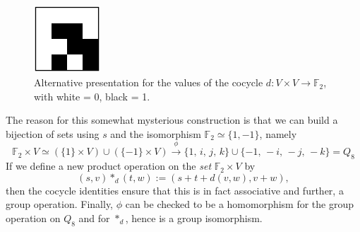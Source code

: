 \documentclass{article}
\theoremstyle{plain}
\theoremstyle{definition}
\def \FF {\mathbb{F}}
\begin{document}
\begin{figure}[!b]
\begin{center}
\includegraphics[height=2.5cm]{quaternion_cocyc} %
\end{center}
\caption{Alternative presentation for the values of the cocycle $d\colon V\times V\to \FF_2$, with white = 0, black = 1.}
\label{fig:cocycle for q8}
\end{figure}


The reason for this somewhat mysterious construction is that we can build a bijection of sets using $s$ and the isomorphism $\FF_2\simeq \{1,-1\}$, namely
\[
	\FF_2\times V \simeq \left(\{1\}\times V\right) \cup \left(\{-1\} \times V\right) \stackrel{\phi}{\longrightarrow}
	\{1,\, i,\, j,\, k\}\cup \{-1,\, -i,\, -j,\, -k\} = Q_8
\]
If we define a new product operation on the \emph{set} $\FF_2\times V$ by
\[
	(s,v)\ast_d(t,w):=(s+ t+ d(v,w),v+w),
\]
then the cocycle identities ensure that this is in fact associative and further, a group operation.
Finally, $\phi$ can be checked to be a homomorphism for the group operation on $Q_8$ and for $\ast_d$, hence is a group isomorphism.
\end{document}
